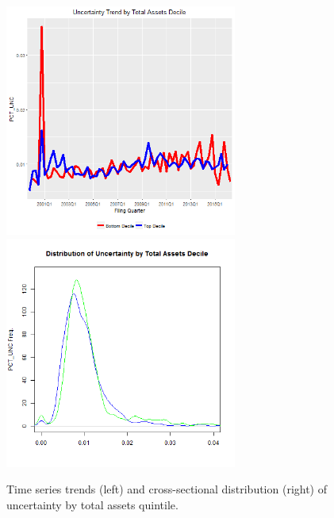 \begin{figure}[H] 
\centering
\includegraphics[width=3in, height=3in]{figures/punc-by-at-ts}
\includegraphics[width=3in, height=3in]{figures/punc-by-at-xs}
\captionsetup{justification=centering, width=.95\textwidth} 
\caption{\footnotesize Time series trends (left) and cross-sectional distribution (right) of uncertainty by total assets quintile.} \label{bunc-at}
\end{figure} 
